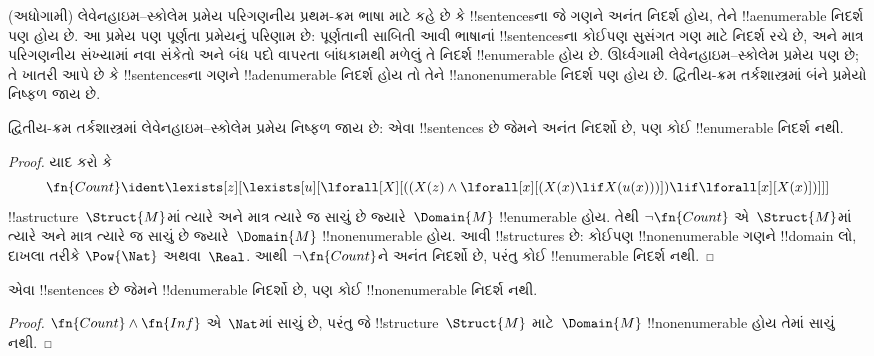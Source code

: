 \documentclass[../../../include/open-logic-section]{subfiles}
\begin{document}


\begin{explain}
(અધોગામી) લેવેનહાઇમ--સ્કોલેમ પ્રમેય પરિગણનીય પ્રથમ-ક્રમ ભાષા
માટે કહે છે કે !!{sentence}sના જે
ગણને અનંત નિદર્શ હોય, તેને !!a{enumerable} નિદર્શ પણ હોય છે. આ
પ્રમેય પણ પૂર્ણતા પ્રમેયનું પરિણામ છે: પૂર્ણતાની સાબિતી
આવી ભાષાનાં !!{sentence}sના કોઈપણ સુસંગત ગણ માટે નિદર્શ રચે છે,
અને માત્ર પરિગણનીય સંખ્યામાં નવા સંકેતો અને બંધ પદો વાપરતા
બાંધકામથી મળેલું તે નિદર્શ !!{enumerable} હોય છે.
ઊર્ધ્વગામી લેવેનહાઇમ--સ્કોલેમ પ્રમેય પણ છે;
તે ખાતરી આપે છે કે !!{sentence}sના ગણને !!a{denumerable} નિદર્શ
હોય તો તેને !!a{nonenumerable} નિદર્શ પણ હોય છે. દ્વિતીય-ક્રમ
તર્કશાસ્ત્રમાં બંને પ્રમેયો નિષ્ફળ જાય છે.
\end{explain}


\begin{thm}
 દ્વિતીય-ક્રમ તર્કશાસ્ત્રમાં લેવેનહાઇમ--સ્કોલેમ
પ્રમેય નિષ્ફળ જાય છે: એવા !!{sentence}s છે જેમને અનંત નિદર્શો છે,
પણ કોઈ !!{enumerable} નિદર્શ નથી.
\end{thm}

\begin{proof}
યાદ કરો કે
\[
\fn{Count} \ident \lexists[z][\lexists[u][\lforall[X][((X(z) \land
      \lforall[x][(X(x) \lif X(u(x)))]) \lif \lforall[x][X(x)])]]]
\]
!!a{structure}~$\Struct{M}$માં ત્યારે અને માત્ર ત્યારે જ સાચું છે
જ્યારે~$\Domain{M}$ !!{enumerable} હોય. તેથી
$\lnot\fn{Count}$ એ~$\Struct{M}$માં ત્યારે અને માત્ર ત્યારે જ
સાચું છે જ્યારે~$\Domain{M}$ !!{nonenumerable} હોય. આવી
!!{structure}s છે: કોઈપણ !!{nonenumerable} ગણને !!{domain} લો,
દાખલા તરીકે $\Pow{\Nat}$ અથવા~$\Real$. આથી
$\lnot \fn{Count}$ને અનંત નિદર્શો છે, પરંતુ કોઈ
!!{enumerable} નિદર્શ નથી.
\end{proof}

\begin{thm}
એવા !!{sentence}s છે જેમને !!{denumerable} નિદર્શો છે,
પણ કોઈ !!{nonenumerable} નિદર્શ નથી.
\end{thm}

\begin{proof}
$\fn{Count} \land \fn{Inf}$ એ~$\Nat$માં સાચું છે, પરંતુ
જે !!{structure}~$\Struct{M}$ માટે~$\Domain{M}$
!!{nonenumerable} હોય તેમાં સાચું નથી.
\end{proof}
\end{document}
